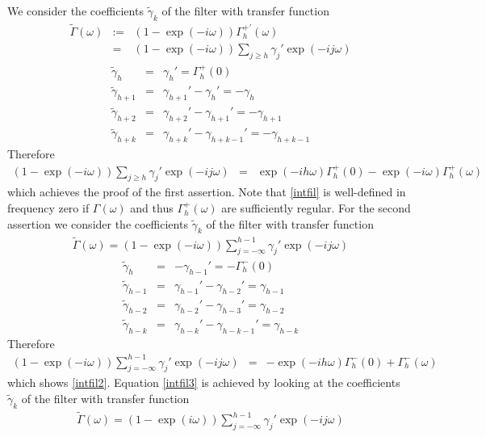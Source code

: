 \documentclass[11pt]{article}
\begin{document}
\begin{appendix}
We consider the coefficients $\tilde{\gamma}_k$ of the filter with transfer function
\begin{eqnarray*}
\tilde{\Gamma}(\omega)&:=&(1-\exp(-i\omega))\Gamma_{h}^{+'}(\omega)\\
&=&(1-\exp(-i\omega))\sum_{j\geq h}\gamma_j'\exp(-ij\omega)
\end{eqnarray*}
\begin{eqnarray*}
\tilde{\gamma}_{h}&=&\gamma_{h}'=\Gamma_{h}^{+}(0)\\
\tilde{\gamma}_{h+1}&=&\gamma_{h+1}'-\gamma_{h}'=-\gamma_{h}\\
\tilde{\gamma}_{h+2}&=&\gamma_{h+2}'-\gamma_{h+1}'=-\gamma_{h+1}\\
\tilde{\gamma}_{h+k}&=&\gamma_{h+k}'-\gamma_{h+k-1}'=-\gamma_{h+k-1}
\end{eqnarray*}
Therefore
\begin{eqnarray*}
(1-\exp(-i\omega))\sum_{j\geq
h}\gamma_j'\exp(-ij\omega)&=&\exp(-ih\omega)\Gamma_{h}^+(0)-\exp(-i\omega)\Gamma_{h}^+(\omega)
\end{eqnarray*}
which achieves the proof of the first assertion. Note that
\ref{intfil} is well-defined in frequency zero if $\Gamma(\omega)$ and thus $\Gamma_{h}^+(\omega)$
are sufficiently regular. For the second assertion we consider the coefficients $\tilde{\gamma}_k$ of the filter with transfer function
\begin{eqnarray*}
\tilde{\Gamma}(\omega)=(1-\exp(-i\omega))\sum_{j=-\infty}^{h-1}\gamma_j'\exp(-ij\omega)
\end{eqnarray*}
\begin{eqnarray*}
\tilde{\gamma}_{h}&=&-\gamma_{h-1}'=-\Gamma_{h}^-(0)\\
\tilde{\gamma}_{h-1}&=&\gamma_{h-1}'-\gamma_{h-2}'=\gamma_{h-1}\\
\tilde{\gamma}_{h-2}&=&\gamma_{h-2}'-\gamma_{h-3}'=\gamma_{h-2}\\
\tilde{\gamma}_{h-k}&=&\gamma_{h-k}'-\gamma_{h-k-1}'=\gamma_{h-k}
\end{eqnarray*}
Therefore
\begin{eqnarray*}
(1-\exp(-i\omega))\sum_{j=-\infty}^{h-1}\gamma_j'\exp(-ij\omega)&=&-\exp(-ih\omega)\Gamma_{h}^-(0)+\Gamma_{h}^-(\omega)
\end{eqnarray*}
which shows \ref{intfil2}. Equation \ref{intfil3} is achieved by looking at the coefficients $\tilde{\gamma}_k$ of the filter with transfer function
\begin{eqnarray*}
\tilde{\Gamma}(\omega)=(1-\exp(i\omega))\sum_{j=-\infty}^{h-1}\gamma_j'\exp(-ij\omega)

\end{eqnarray*}
\end{appendix}
\end{document}

